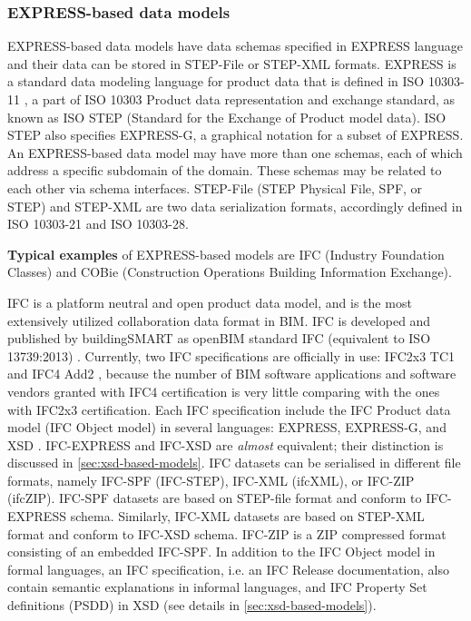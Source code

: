 \subsubsection{EXPRESS-based data models}\label{sec:express-based-data-models}



EXPRESS-based data models have data schemas specified in EXPRESS language \cite{iso2004express} and their data can be stored in STEP-File or STEP-XML formats.
EXPRESS is a standard data modeling language for product data that is defined in ISO 10303-11 \cite{iso2004express}, a part of ISO 10303 Product data representation and exchange standard, as known as ISO STEP (Standard for the Exchange of Product model data).
ISO STEP also specifies EXPRESS-G, a graphical notation for a subset of EXPRESS.
An EXPRESS-based data model may have more than one schemas, each of which address a specific subdomain of the domain.
These schemas may be related to each other via schema interfaces.
STEP-File (STEP Physical File, SPF, or STEP) \cite{iso2016stepfile} and STEP-XML \cite{iso2007stepxml} are two data serialization formats, accordingly defined in ISO 10303-21 and ISO 10303-28.


\textbf{Typical examples} of EXPRESS-based models are IFC (Industry Foundation Classes) and COBie (Construction Operations Building Information Exchange).

IFC is a platform neutral and open product data model, and is the most extensively utilized collaboration data format in BIM.
IFC is developed and published by buildingSMART as openBIM standard IFC (equivalent to ISO 13739:2013) \cite{iso2013ifc}.
Currently, two IFC specifications are officially in use: IFC2x3 TC1 \cite{liebich2007ifc2x3} and IFC4 Add2 \cite{liebich2016ifc4}, because the number of BIM software applications and software vendors granted with IFC4 certification is very little comparing with the ones with IFC2x3 certification.
Each IFC specification include the IFC Product data model (IFC Object model) in several languages: EXPRESS, EXPRESS-G, and XSD \cite{liebich2007ifc2x3, liebich2016ifc4}.
IFC-EXPRESS and IFC-XSD are \emph{almost} equivalent; their distinction is discussed in \autoref{sec:xsd-based-models}.
IFC datasets can be serialised in different file formats, namely IFC-SPF (IFC-STEP), IFC-XML (ifcXML), or IFC-ZIP (ifcZIP).
IFC-SPF datasets are based on STEP-file format and conform to IFC-EXPRESS schema.
Similarly, IFC-XML datasets are based on STEP-XML format and conform to IFC-XSD schema.
IFC-ZIP is a ZIP compressed format consisting of an embedded IFC-SPF.
In addition to the IFC Object model in formal languages, an IFC specification, i.e. an IFC Release documentation, also contain semantic explanations in informal languages, and IFC Property Set definitions (PSDD) in XSD (see details in \ref{sec:xsd-based-models}).


